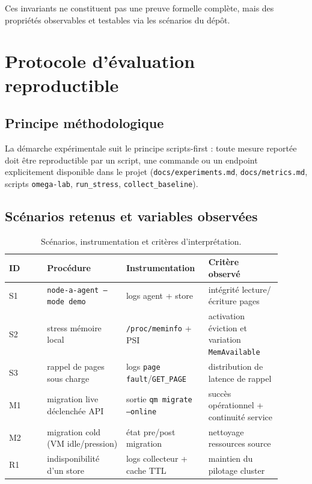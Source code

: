 Ces invariants ne constituent pas une preuve formelle complète, mais des propriétés observables et testables via les scénarios du dépôt.

\section{Protocole d’évaluation reproductible}
\label{sec:protocole-evaluation}

\subsection{Principe méthodologique}

La démarche expérimentale suit le principe \og scripts-first \fg{} : toute mesure reportée doit être reproductible par un script, une commande ou un endpoint explicitement disponible dans le projet (\texttt{docs/experiments.md}, \texttt{docs/metrics.md}, scripts \texttt{omega-lab}, \texttt{run\_stress}, \texttt{collect\_baseline}).

\subsection{Scénarios retenus et variables observées}

\begin{table}[htbp]
    \centering
    \caption{Scénarios, instrumentation et critères d’interprétation.}
    \label{tab:scenarios-eval}
    \begin{tabular}{p{0.13\linewidth} p{0.27\linewidth} p{0.25\linewidth} p{0.25\linewidth}}
        \toprule
        \textbf{ID} & \textbf{Procédure} & \textbf{Instrumentation} & \textbf{Critère observé} \\
        \midrule
        S1 & \texttt{node-a-agent --mode demo} & logs agent + store & intégrité lecture/écriture pages \\
        S2 & stress mémoire local & \texttt{/proc/meminfo} + PSI & activation éviction et variation \texttt{MemAvailable} \\
        S3 & rappel de pages sous charge & logs \texttt{page fault}/\texttt{GET\_PAGE} & distribution de latence de rappel \\
        M1 & migration live déclenchée API & sortie \texttt{qm migrate --online} & succès opérationnel + continuité service \\
        M2 & migration cold (VM idle/pression) & état pre/post migration & nettoyage ressources source \\
        R1 & indisponibilité d’un store & logs collecteur + cache TTL & maintien du pilotage cluster \\
        \bottomrule
    \end{tabular}
\end{table}

